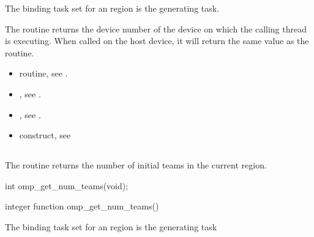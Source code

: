 \binding
The binding task set for an  region is the generating task.

\effect
The  routine returns the device number of the device on which
the calling thread is executing. When called on the host device, it will return the same
value as the  routine.

\crossreferences
\begin{itemize}

\item {} routine, see
.

\item {}, see
.


\item {}, see
.

\item {} construct, see

\end{itemize}










\subsection{}
\label{subsec:omp_get_num_teams}
\summary
The  routine returns the number of initial teams in the current 
region.

\format
\begin{ccppspecific}
\begin{ompcFunction}
int omp_get_num_teams(void);
\end{ompcFunction}
\end{ccppspecific}

\begin{fortranspecific}
\begin{ompfFunction}
integer function omp_get_num_teams()
\end{ompfFunction}
\end{fortranspecific}

\binding
The binding task set for an  region is the generating task

